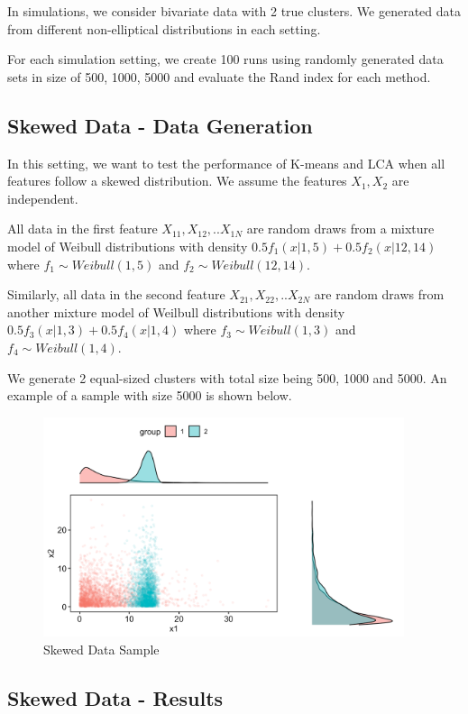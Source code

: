 \documentclass[
]{article}
\begin{document}
In simulations, we consider bivariate data with 2 true clusters. We
generated data from different non-elliptical distributions in each
setting.

For each simulation setting, we create 100 runs using randomly generated
data sets in size of 500, 1000, 5000 and evaluate the Rand index for
each method.

\hypertarget{skewed-data---data-generation}{%
\subsection{Skewed Data - Data
Generation}\label{skewed-data---data-generation}}

In this setting, we want to test the performance of K-means and LCA when
all features follow a skewed distribution. We assume the features
\(X_1, X_2\) are independent.

All data in the first feature \(X_{11}, X_{12},..X_{1N}\) are random
draws from a mixture model of Weibull distributions with density
\(0.5f_1(x|1,5) + 0.5f_2(x|12,14)\) where \(f_1 \sim Weibull(1,5)\) and
\(f_2 \sim Weibull (12,14)\).

Similarly, all data in the second feature \(X_{21}, X_{22},..X_{2N}\)
are random draws from another mixture model of Weilbull distributions
with density \(0.5f_3(x|1,3) + 0.5f_4(x|1,4)\) where
\(f_3 \sim Weibull(1,3)\) and \(f_4 \sim Weibull (1,4)\).

We generate 2 equal-sized clusters with total size being 500, 1000 and
5000. An example of a sample with size 5000 is shown below.

\begin{figure}
\centering
\includegraphics[width=4.16667in,height=\textheight]{report_image/skewed_sample.png}
\caption{Skewed Data Sample}
\end{figure}

\hypertarget{skewed-data---results}{%
\subsection{Skewed Data - Results}\label{skewed-data---results}}
\end{document}

